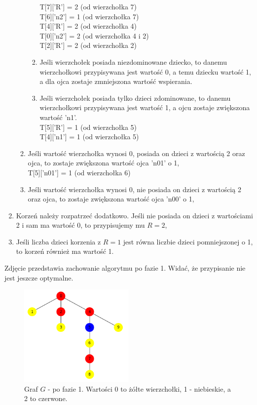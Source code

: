 \begin{enumerate}
\begin{enumerate}
\begin{enumerate}
                T[7]['R'] = 2  (od wierzchołka 7)\\
                T[6]['n2'] = 1  (od wierzchołka 7)\\
                T[4]['R'] = 2  (od wierzchołka 4)\\
                T[0]['n2'] = 2  (od wierzchołka 4 i 2)\\
                T[2]['R'] = 2  (od wierzchołka 2)\
                \item Jeśli wierzchołek posiada niezdominowane dziecko, to danemu wierzchołkowi przypisywana jest wartość 0, a temu dziecku wartość 1, a dla ojca zostaje zmniejszona wartość wspierania.
                \item Jeśli wierzchołek posiada tylko dzieci zdominowane, to danemu wierzchołkowi przypisywana jest wartość 1, a ojcu zostaje zwiększona wartość 'n1'.\\
                T[5]['R'] = 1  (od wierzchołka 5)\\
                T[4]['n1'] = 1  (od wierzchołka 5)
            \end{enumerate}
        \item Jeśli wartość wierzchołka wynosi 0, posiada on dzieci z wartością 2 oraz ojca, to zostaje zwiększona wartość ojca 'n01' o 1,\\
        T[5]['n01'] = 1  (od wierzchołka 6)
        \item Jeśli wartość wierzchołka wynosi 0, nie posiada on dzieci z wartością 2 oraz ojca, to zostaje zwiększona wartość ojca 'n00' o 1,\\
    \end{enumerate}
    \item Korzeń należy rozpatrzeć dodatkowo. Jeśli nie posiada on dzieci z wartościami 2 i sam ma wartość 0, to przypisujemy mu $R=2$,
    \item Jeśli liczba dzieci korzenia z $R=1$ jest równa liczbie dzieci pomniejszonej o 1, to korzeń również ma wartość 1.
\end{enumerate}

Zdjęcie przedstawia zachowanie algorytmu po fazie 1. Widać, że przypisanie nie jest jeszcze optymalne.

\begin{figure}[H]
    \centering
    \includegraphics[width=0.5\textwidth]{assets/phase1.png}
    \caption{Graf $G$ - po fazie 1. Wartości 0 to żółte wierzchołki, 1 - niebieskie, a 2 to czerwone.}
    \label{fig:drzewoFaza1}
\end{figure}

